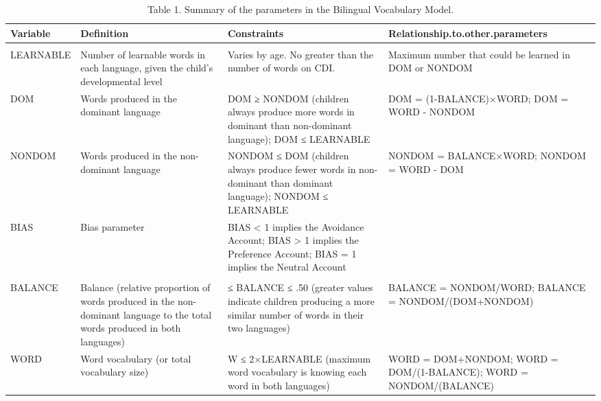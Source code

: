 \documentclass[
  english,
  ,man,floatsintext]{apa6}
\begin{document}
\begin{landscape}\begin{table}

\caption{\label{tab:table1}Table 1. Summary of the parameters in the Bilingual Vocabulary Model.}
\centering
\fontsize{7}{9}\selectfont
\begin{tabular}[t]{l>{\raggedright\arraybackslash}p{175px}>{\raggedright\arraybackslash}p{175px}>{\raggedright\arraybackslash}p{175px}}
\toprule
Variable & Definition & Constraints & Relationship.to.other.parameters\\
\midrule
\addlinespace[0.3em]
\multicolumn{4}{l}{\textbf{Main Parameters}}\\
\hspace{1em}LEARNABLE & Number of learnable words in each language, given the child’s developmental level & Varies by age. No greater than the number of words on CDI. & Maximum number that could be learned in DOM or NONDOM\\
\hspace{1em}DOM & Words produced in the dominant language & DOM ≥ NONDOM (children always produce more words in dominant than non-dominant language); DOM ≤ LEARNABLE & DOM = (1-BALANCE)×WORD; DOM = WORD - NONDOM\\
\hspace{1em}NONDOM & Words produced in the non-dominant language & NONDOM ≤ DOM (children always produce fewer words in non-dominant than dominant language); NONDOM ≤ LEARNABLE & NONDOM = BALANCE×WORD; NONDOM = WORD - DOM\\
\hspace{1em}BIAS & Bias parameter & BIAS < 1 implies the Avoidance Account; BIAS > 1 implies the Preference Account; BIAS = 1 implies the Neutral Account & \\
\addlinespace[0.3em]
\multicolumn{4}{l}{\textbf{Derived Parameters}}\\
\hspace{1em}BALANCE & Balance (relative proportion of words produced in the non-dominant language to the total words produced in both languages) & 0 ≤ BALANCE ≤ .50 (greater values indicate children producing a more similar number of words in their two languages) & BALANCE = NONDOM/WORD; BALANCE = NONDOM/(DOM+NONDOM)\\
\hspace{1em}WORD & Word vocabulary (or total vocabulary size) & W ≤ 2×LEARNABLE (maximum word vocabulary is knowing each word in both languages) & WORD = DOM+NONDOM; WORD = DOM/(1-BALANCE); WORD = NONDOM/(BALANCE)\\

\end{tabular}
\end{table}
\end{landscape}
\end{document}
